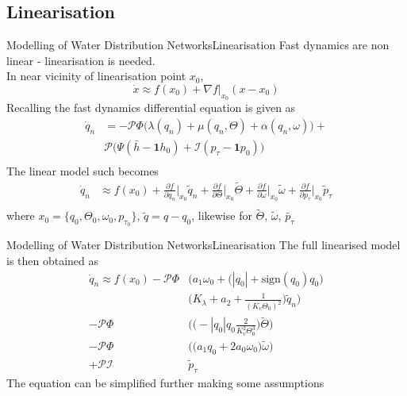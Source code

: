 \subsection{Linearisation}
\begin{frame}{Modelling of Water Distribution Networks}{Linearisation}
	Fast dynamics are non linear - linearisation is needed.\\
	In near vicinity of linearisation point $ x_0 $,
	\begin{equation*}
		\dot{x} \approx f(x_0) + \nabla f\bigg\rvert_{x_0} (x-x_0)
	\end{equation*}
	Recalling the fast dynamics differential equation is given as
	\begin{equation}\label{eq:NonLinearModelSimplified}
		\begin{split}
			\dot{q}_n &=  -\mathcal{P}\Phi\Big(\lambda(q_n)+\mu(q_n,\Theta)+\alpha(q_n,\omega)\Big) +\\ &\mathcal{P}\Big(\Psi(\bar{h}-\mathbf{1}h_0) + \mathcal{I}(p_{\tau}-\mathbf{1}p_0)\Big) \\
		\end{split}	
	\end{equation}
	The linear model such becomes
	\begin{equation}\label{eq:SymbolicLinearisation}
		\begin{split}
			\dot{q}_n &\approx f(x_0) + \frac{\partial f}{\partial q_n}\bigg\rvert_{x_0} \tilde{q}_n + \frac{\partial f}{\partial \Theta}\bigg\rvert_{x_0} \tilde{\Theta} + \frac{\partial f}{\partial \omega}\bigg\rvert_{x_0} \tilde{\omega} +  \frac{\partial f}{\partial p_\tau}\bigg\rvert_{x_0} \tilde{p}_\tau
			\\
		\end{split}
	\end{equation}
	where $x_0 = \{q_0,\Theta_0,\omega_0, p_{\tau_0} \}$, $ \tilde{q} =q-q_0$, likewise for $ \tilde{\Theta} $, $ \tilde{\omega}$, $\tilde{p_{\tau}}  $
\end{frame}

\begin{frame}{Modelling of Water Distribution Networks}{Linearisation}
	The full linearised model is then obtained as
	\begin{equation}\label{eq:SymbolicLinearisationExpanded}
		\begin{split}
			\dot{q}_n \approx f(x_0) -\mathcal{P}\Phi & \Bigg(a_1\omega_0 + \Big(|q_0|+\text{sign}(q_0)q_0\Big)\\
			& \Bigg(K_\lambda + a_2 + \frac{1}{(K_v \Theta_0)^2}\Bigg) \tilde{q}_n \Bigg)  \\
			- \mathcal{P}\Phi&\Bigg(\Big(-|q_0|q_0 \frac{2}{K_v^2 \Theta_0^3}\Big) \tilde{\Theta}\Bigg) \\
			- \mathcal{P}\Phi&\Bigg(\Big(a_1 q_0 + 2a_0\omega_0\Big) \tilde{\omega}\Bigg) \\
			+ \mathcal{P} \mathcal{I}& \tilde{p}_\tau
		\end{split}
	\end{equation}
The equation can be simplified further making some assumptions
\end{frame}

